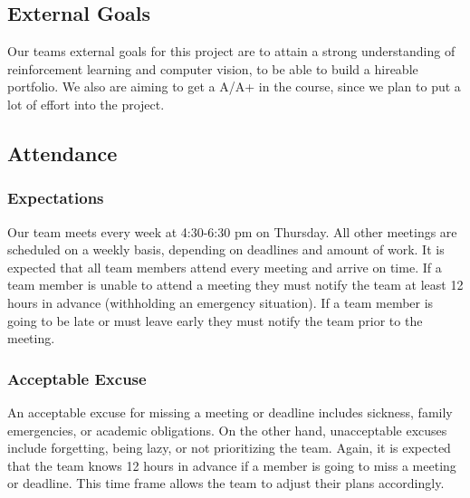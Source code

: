 \documentclass{article}
\begin{document}
\subsection*{External Goals}


\raggedright
Our teams external goals for this project are to attain a strong understanding
of reinforcement learning and computer vision, to be able to build a hireable portfolio. 
We also are aiming to get a A/A+ in the course, since we plan to put a lot of effort into the
project.

\subsection*{Attendance}

\subsubsection*{Expectations}


\raggedright
Our team meets every week at 4:30-6:30 pm on Thursday. All other meetings are 
scheduled on a weekly basis, depending on deadlines and amount of work. It is expected that all
team members attend every meeting and arrive on time. If a team member is unable
to attend a meeting they must notify the team at least 12 hours in advance (withholding an emergency situation). If a 
team member is going to be late or must leave early they must notify the team prior
to the meeting. 

\subsubsection*{Acceptable Excuse}


\raggedright
An acceptable excuse for missing a meeting or deadline includes sickness, family
emergencies, or academic obligations. On the other hand, unacceptable excuses include
forgetting, being lazy, or not prioritizing the team. Again, it is expected that the team
knows 12 hours in advance if a member is going to miss a meeting or deadline. This time
frame allows the team to adjust their plans accordingly.
\end{document}
